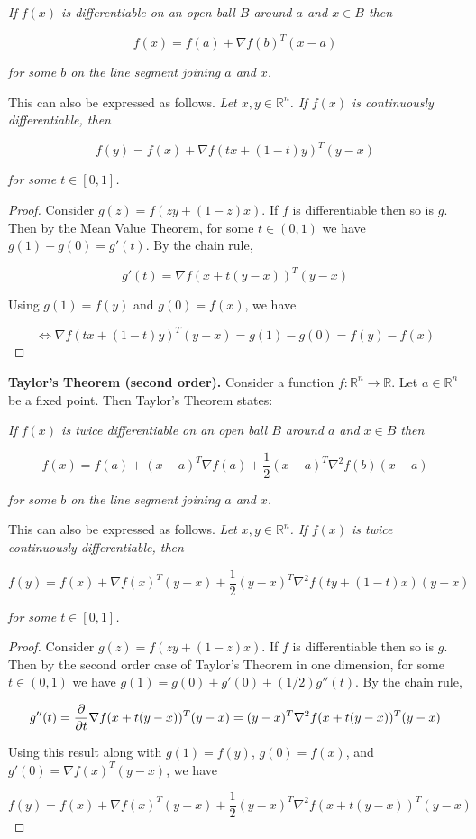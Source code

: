 \textit{If \(f(x)\) is differentiable on an open ball \(B\) around \(a\) and \(x \in B\) then}

\[
f(x) = f(a) + \nabla f(b)^T(x - a)
\]

\textit{for some \(b\) on the line segment joining \(a\) and \(x\).} 

This can also be expressed as follows. \textit{Let \(x, y \in \mathbb{R}^n\). If \(f(x)\) is continuously differentiable, then}

\[
f(y) = f(x) + \nabla f(tx + (1-t)y)^T  (y - x)
\]

\textit{for some \(t \in [0, 1]\).} 

\begin{proof}
Consider \(g(z) = f(zy + (1-z)x)\). If \(f\) is differentiable then so is \(g\). Then by the Mean Value Theorem, for some \(t \in (0, 1)\) we have \(g(1) - g(0) = g'(t)\). By the chain rule,

\[
g'(t) = \nabla f(x + t(y - x))^T (y - x)
\]

Using \(g(1) = f(y)\) and \(g(0) = f(x)\), we have

\[
\iff  \nabla f(tx + (1-t)y)^T (y - x) = g(1) - g(0) = f(y) - f(x)
\]
\end{proof}

\textbf{Taylor's Theorem (second order).} Consider a function \(f: \mathbb{R}^n \to \mathbb{R}\). Let \(a \in \mathbb{R}^n\) be a fixed point. Then Taylor's Theorem states:

\textit{If \(f(x)\) is twice differentiable on an open ball \(B\) around \(a\) and \(x \in B\) then}

\[
f(x) = f(a) + (x -a)^T \nabla f(a) + \frac{1}{2}(x-a)^T \nabla^2 f(b) (x-a)
\]

\textit{for some \(b\) on the line segment joining \(a\) and \(x\).} 

This can also be expressed as follows. \textit{Let \(x, y \in \mathbb{R}^n\). If \(f(x)\) is twice continuously differentiable, then}

\[
f(y) = f(x) +  \nabla f(x)^T (y -x) + \frac{1}{2}(y - x)^T \nabla^2 f(ty + (1-t)x) (y - x)
\]

\textit{for some \(t \in [0, 1]\).} 

\begin{proof}
Consider \(g(z) = f(zy + (1-z)x)\). If \(f\) is differentiable then so is \(g\). Then by the second order case of Taylor's Theorem in one dimension, for some \(t \in (0, 1)\) we have \(g(1) =  g(0) + g'(0) + (1/2)g''(t)\). By the chain rule,

\[
g''(t) =  \frac{\partial }{\partial t} \nabla f(x + t(y - x))^T (y - x) = (y - x)^T \nabla^2 f(x + t(y - x))^T (y - x) 
\]

Using this result along with \(g(1) = f(y)\),  \(g(0) = f(x)\), and \(g'(0) = \nabla f(x)^T (y - x) \),  we have

\[
f(y) = f(x) + \nabla f(x)^T (y - x)  + \frac{1}{2} (y - x)^T \nabla^2 f(x + t(y - x))^T (y - x) 
\]
\end{proof}

